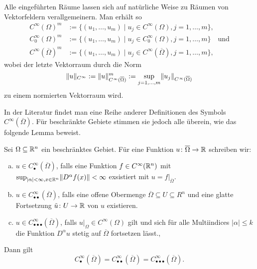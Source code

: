 Alle eingeführten Räume lassen sich auf natürliche Weise zu Räumen von Vektor\-feldern verallgemeinern.
Man erhält so
\begin{align*}
  C^\infty(\Omega)^m &:= \{(u_1,\dots,u_m) \mid u_j \in C^\infty(\Omega), j = 1,\dots,m\}, \\
  C_0^\infty(\Omega)^m &:= \{(u_1,\dots,u_m) \mid u_j \in C_0^\infty(\Omega), j = 1,\dots,m\} \quad\text{und} \\
  C^\infty(\overline\Omega)^m &:= \{(u_1,\dots,u_m) \mid u_j \in C^\infty(\overline\Omega), j = 1,\dots,m\},
\end{align*}
wobei der letzte Vektorraum durch die Norm
$$
\lVert u \rVert_{C^\infty} := \lVert u \rVert_{C^\infty(\overline\Omega)}^m := \sup_{j = 1,\dots, m} \lVert u_j \rVert_{C^\infty(\overline\Omega)}
$$
zu einem normierten Vektorraum wird.

In der Literatur findet man eine Reihe anderer Definitionen des Symbols $C^\infty(\overline\Omega)$.
Für beschränkte Gebiete stimmen sie jedoch alle überein, wie das folgende Lemma beweist.

\begin{lem}
  \label{lem:CInftyClosedOmega}
  Sei $\Omega \subseteq \mathbb{R}^n$ ein beschränktes Gebiet.
  Für eine Funktion $u \colon \overline\Omega \to \mathbb{R}$ schreiben wir:
  \begin{enumerate}[(a)]
    \item $u \in C^\infty_\bullet(\overline\Omega)$,
      falls eine Funktion $f \in C^\infty(\mathbb{R}^n)$ mit $\sup_{|\alpha| < \infty, x \in \mathbb{R}^n} \lVert D^\alpha f(x) \rVert <  \infty$ exsistiert mit $u = f|_{\overline\Omega}$.\cite[S.23, I.3.1]{sohr2001navier}

    \item $u \in C^\infty_{\bullet\bullet}(\overline\Omega)$,
      falls eine offene Obermenge $\overline\Omega \subseteq U \subseteq R^n$ und eine glatte Fortsetzung $\tilde u \colon U \to \mathbb{R}$ von $u$ existieren.

    \item $ u \in C^\infty_{\bullet\bullet\bullet}(\overline\Omega)$,
    falls $u|_\Omega \in C^\infty(\Omega)$ gilt und sich für alle Multiindices $|\alpha|\leq k$ die Funktion $D^\alpha u$ stetig auf $\overline\Omega$ fortsetzen lässt.\cite[S.10, 1.28]{adams2003sobolev},\cite[S.35, II.1.3]{galdi2011navier}
  \end{enumerate}

  Dann gilt
  $$
    C^\infty_{\bullet}(\overline\Omega) =
    C^\infty_{\bullet\bullet}(\overline\Omega) =
    C^\infty_{\bullet\bullet\bullet}(\overline\Omega).
  $$
\end{lem}

